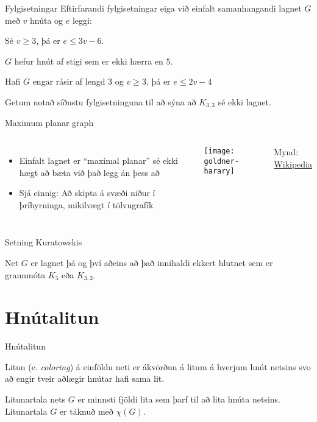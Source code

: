 \documentclass[handout]{beamer}
\begin{document}
\begin{frame}{Fylgisetningar}
Eftirfarandi fylgisetningar eiga við einfalt samanhangandi lagnet $G$ með $v$ hnúta og $e$ leggi:
\begin{tcolorbox}
Sé $v \geq 3$, þá er $e \leq 3v - 6$.
\end{tcolorbox}

\begin{tcolorbox}
$G$ hefur hnút af stigi sem er ekki hærra en $5$.
\end{tcolorbox}

\begin{tcolorbox}
Hafi $G$ engar rásir af lengd 3 og $v \geq 3$, þá er $e \leq 2v -4$
\end{tcolorbox}
Getum notað síðustu fylgisetninguna til að sýna að $K_{3,3}$ sé ekki lagnet.
\end{frame}

\begin{frame}{Maximum planar graph}
    \begin{columns}
        \begin{itemize}
            \item Einfalt lagnet er ``maximal planar'' sé ekki hægt að bæta við það legg án þess að 
            \item Sjá einnig: Að skipta á svæði niður í þríhyrninga, mikilvægt í tölvugrafík
        \end{itemize}
        \texttt{[image: goldner-harary]}
        \begin{center}
            Mynd: \href{https://en.wikipedia.org/wiki/File:Goldner-Harary\_graph.svg}{Wikipedia}
        \end{center}
    \end{columns}
\end{frame}

\begin{frame}{Setning Kuratowskis}
\begin{tcolorbox}[title=Setning Kuratowskis]
Net $G$ er lagnet þá og því aðeins að það innihaldi ekkert hlutnet sem er grannmóta $K_5$ eða $K_{3,3}$.
\end{tcolorbox}
\end{frame}

\section{Hnútalitun}

\begin{frame}{Hnútalitun}
\begin{tcolorbox}[title=Litun]
Litun (e. \emph{coloring}) á einföldu neti er ákvörðun á litum á hverjum hnút netsins svo að engir tveir aðlægir hnútar hafi sama lit.
\end{tcolorbox}

\begin{tcolorbox}[title=Litunartala]
Litunartala nets $G$ er minnsti fjöldi lita sem þarf til að lita hnúta netsins. Litunartala $G$ er táknuð með $\chi(G)$.
\end{tcolorbox}

\end{frame}
\end{document}
